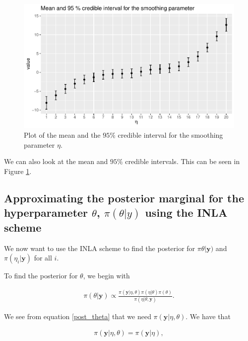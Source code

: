 \begin{figure}[h]
    \centering
    \includegraphics[width=\textwidth]{Images/post_eta_mcmc.pdf}
    \caption{Plot of the mean and the $95\%$ credible interval for the smoothing parameter $\eta$. }
    \label{fig:post_eta_mcmc}
\end{figure}

We can also look at the mean and $95 \%$ credible intervals. This can be seen in Figure \ref{fig:post_eta_mcmc}.


\subsection{Approximating the posterior marginal for the hyperparameter $\theta$, $\pi(\theta|y)$ using the INLA scheme}
\label{theta_post_inla}

We now want to use the INLA scheme to find the posterior for $\pi\theta| \boldsymbol{y})$ and $\pi(\eta_i| \boldsymbol{y})$ for all $i$.


To find the posterior for $\theta$, we begin with

\begin{align}\label{post_theta}
    \pi(\theta|\mathbf{y}) \propto \frac{\pi(\mathbf{y}|\eta,\theta)\pi(\eta|\theta)\pi(\theta)}{\pi(\eta|\theta, \mathbf{y})}.
\end{align}

We see from equation \ref{post_theta} that we need $\pi(\boldsymbol{y}| \eta, \theta)$. We have that 

\begin{align}
    \pi(\mathbf{y}| \eta, \theta) = \pi(\mathbf{y}|\eta),  
\end{align}


